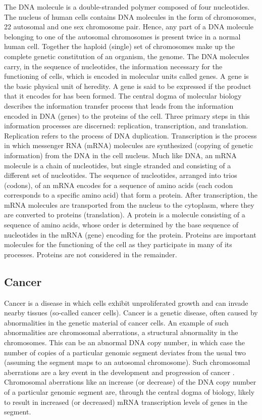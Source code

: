 \documentclass[a4paper]{article}
\theoremstyle{myexamplestyle}
\begin{document}
The DNA molecule is a double-stranded polymer composed of four nucleotides. The nucleus of human cells contains DNA molecules in the form of chromosomes, 22 autosomal and one sex chromosome pair. Hence, any part of a DNA molecule belonging to one of the autosomal chromosomes is present twice in a normal human cell. Together the haploid (single) set of chromosomes make up the complete genetic constitution of an organism, the genome. The DNA molecules carry, in the sequence of nucleotides, the information necessary for the functioning of cells, which is encoded in molecular units called genes. A gene is the basic physical unit of heredity. A gene is said to be expressed if the product that it encodes for has been formed. The central dogma of molecular biology describes the information transfer process that leads from the information encoded in DNA (genes) to the proteins of the cell. Three primary steps in this information processes are discerned: replication, transcription, and translation. Replication refers to the process of DNA duplication. Transcription is the process in which messenger RNA (mRNA) molecules are synthesized (copying of genetic information) from the DNA in the cell nucleus. Much like DNA, an mRNA molecule is a chain of nucleotides, but single stranded and consisting of a different set of nucleotides. The sequence of nucleotides, arranged into trios (codons), of an mRNA encodes for a sequence of amino acids (each codon corresponds to a specific amino acid) that form a protein. After transcription, the mRNA molecules are transported from the nucleus to the cytoplasm, where they are converted to proteins (translation). A protein is a molecule consisting of a sequence of amino acids, whose order is determined by the base sequence of nucleotides in the mRNA (gene) encoding for the protein. Proteins are important molecules for the functioning of the cell as they participate in many of its processes. Proteins are not considered in the remainder.



\subsection{Cancer}
Cancer is a disease in which cells exhibit unproliferated growth and can invade nearby tissues (so-called cancer cells). Cancer is a genetic disease, often caused by abnormalities in the genetic material of cancer cells. An example of such abnormalities are chromosomal aberrations, a structural abnormality in the chromosomes. This can be an abnormal DNA copy number, in which case the number of copies of a particular genomic segment deviates from the usual two (assuming the segment maps to an autosomal chromosome). Such chromosomal aberrations are a key event in the development and progression of cancer \cite{Len1998}. Chromosomal aberrations like an increase (or decrease) of the DNA copy number of a particular genomic segment are, through the central dogma of biology, likely to result in increased (or decreased) mRNA transcription levels of genes in the segment.
\end{document}
